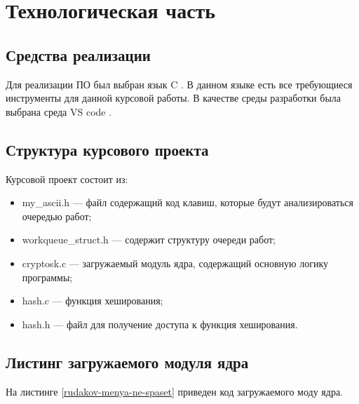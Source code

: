 \section{\large Технологическая часть}

\subsection{Средства реализации}

Для реализации ПО был выбран язык C \cite{C}.
В данном языке есть все требующиеся инструменты для данной курсовой работы.
В качестве среды разработки была выбрана среда VS code \cite{vscode}.

\subsection{Структура курсового проекта}

Курсовой проект состоит из:

\begin{itemize}
    \item my\_ascii.h --- файл содержащий код клавиш, которые будут анализироваться очередью работ;
    \item workqueue\_struct.h --- содержит структуру очереди работ;
    \item cryptosk.c --- загружаемый модуль ядра, содержащий основную логику программы;
    \item hash.c --- функция хеширования;
    \item hash.h --- файл для получение доступа к функция хеширования.
\end{itemize}

\subsection{Листинг загружаемого модуля ядра}

На листинге \ref{rudakov-menya-ne-spaset} приведен код загружаемого моду ядра. 

